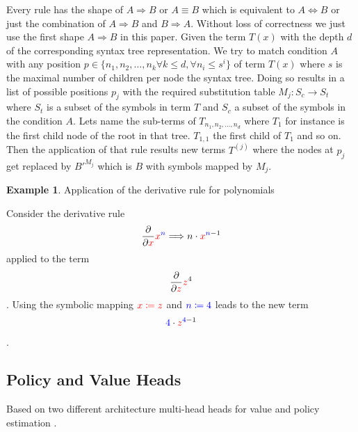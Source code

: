 \documentclass{scrartcl}
\theoremstyle{definition}
\newtheorem{exmp}{Example}[section]
\begin{document}
Every rule has the shape of $A \Longrightarrow B$ or $A \equiv B$ which is equivalent to $A \Longleftrightarrow B$ or just the combination of $A \Longrightarrow B$ and $B \Longrightarrow A$.
Without loss of correctness we just use the first shape $A \Longrightarrow B$ in this paper. Given the term $T\left(x\right)$ with the depth $d$ of the corresponding syntax tree representation.
We try to match condition $A$ with any position $p \in \big\{ n_1, n_2, \dots, n_k \forall k \leq d, \forall n_i \leq s^i \big\}$ of term $T\left(x\right)$ where $s$ is the maximal number of children per node the syntax tree.
Doing so results in a list of possible positions $p_j$ with the required substitution table $M_j: S_c \to S_t$ where $S_t$ is a subset of the symbols in term $T$ and $S_c$ a subset of the symbols in the condition $A$.
Lets name the sub-terms of $T_{n_1, n_2, \dots, n_d}$ where $T_1$ for instance is the first child node of the root in that tree.
$T_{1,1}$ the first child of $T_1$ and so on.
Then the application of that rule results new terms $T^{(j)}$ where the nodes at $p_j$ get replaced by $B'^{M_j}$ which is $B$ with symbols mapped by $M_j$. 

\begin{exmp}
Application of the derivative rule for polynomials

Consider the derivative rule
\begin{align}
	\frac{\partial}{\partial {\color{red}x}} {\color{red}x}^{\color{blue}n} \Longrightarrow n\cdot {\color{red}x}^{{\color{blue}n}-1} 
\end{align}
applied to the term
\begin{align}
	\frac{\partial}{\partial {\color{red}z}} {\color{red}z}^4 
\end{align}.
Using the symbolic mapping ${\color{red}x \coloneqq z}$ and ${\color{blue}n \coloneqq {\color{blue}4}}$ leads to the new term
\begin{align}
	{\color{blue}4}\cdot {\color{red}z}^{{\color{blue}4}-1} 
\end{align}.

\end{exmp}

\subsection{Policy and Value Heads}

Based on two different architecture multi-head heads for value and policy estimation \cite{44806}.
\end{document}
